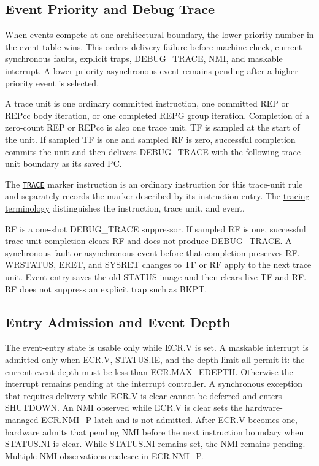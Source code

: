 \subsection{Event Priority and Debug Trace}\label{section:event-priority-and-debug-trace}
When events compete at one architectural boundary, the lower priority number in the event table wins. This orders
delivery failure before machine check, current synchronous faults, explicit traps, DEBUG\_TRACE, NMI, and maskable
interrupt. A lower-priority asynchronous event remains pending after a higher-priority event is selected.

A trace unit is one ordinary committed instruction, one committed REP or REPcc body iteration, or one completed
REPG group iteration. Completion of a zero-count REP or REPcc is also one trace unit. TF is sampled at the start of
the unit. If sampled TF is one and sampled RF is zero, successful completion commits the unit and then
delivers DEBUG\_TRACE with the following trace-unit boundary as its saved PC.

The \hyperref[instr:trace]{\texttt{TRACE}} marker instruction is an ordinary instruction for this trace-unit rule
and separately records the marker described by its instruction entry. The
\hyperref[section:tracing-terminology]{tracing terminology} distinguishes the instruction, trace unit, and event.

RF is a one-shot DEBUG\_TRACE suppressor. If sampled RF is one, successful trace-unit completion clears RF and does
not produce DEBUG\_TRACE. A synchronous fault or asynchronous event before that completion preserves RF. WRSTATUS,
ERET, and SYSRET changes to TF or RF apply to the next trace unit. Event entry saves the old STATUS image and then
clears live TF and RF. RF does not suppress an explicit trap such as BKPT.

\subsection{Entry Admission and Event Depth}
The event-entry state is usable only while ECR.V is set. A maskable interrupt is admitted only when ECR.V,
STATUS.IE, and the depth limit all permit it: the current event depth must be less than ECR.MAX\_EDEPTH. Otherwise the
interrupt remains pending at the interrupt controller. A synchronous exception that requires delivery while ECR.V is
clear cannot be deferred and enters SHUTDOWN. An NMI observed while ECR.V is clear sets the hardware-managed
ECR.NMI\_P latch and is not admitted. After ECR.V becomes one, hardware admits that pending NMI before the next
instruction boundary when STATUS.NI is clear. While STATUS.NI remains set, the NMI remains pending. Multiple NMI
observations coalesce in ECR.NMI\_P.

